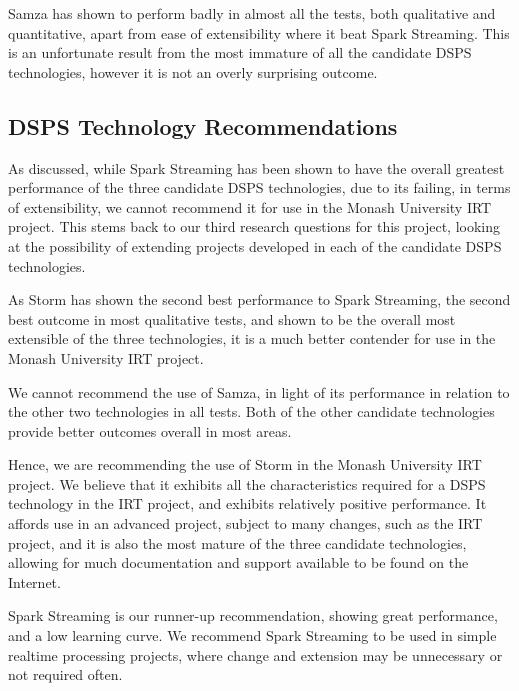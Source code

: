 Samza has shown to perform badly in almost all the tests, both qualitative and quantitative, apart from ease of extensibility where it beat Spark Streaming.
This is an unfortunate result from the most immature of all the candidate DSPS technologies, however it is not an overly
surprising outcome.



\subsection{DSPS Technology Recommendations} %
\label{sub:dsps_technology_recommendations}

As discussed, while Spark Streaming has been shown to have the overall greatest performance of the three candidate DSPS
technologies, due to its failing, in terms of extensibility, we cannot recommend it for use in the Monash University IRT
project. This stems back to our third research questions for this project, looking at the possibility of extending projects
developed in each of the candidate DSPS technologies.

As Storm has shown the second best performance to Spark Streaming, the second best outcome in most qualitative tests,
and shown to be the overall most extensible of the three technologies, it is a much better contender for use in the Monash
University IRT project.

We cannot recommend the use of Samza, in light of its performance in relation to the other two technologies in all tests.
Both of the other candidate technologies provide better outcomes overall in most areas.

Hence, we are recommending the use of Storm in the Monash University IRT project. We believe that it exhibits all the
characteristics required for a DSPS technology in the IRT project, and exhibits relatively positive performance. It affords
use in an advanced project, subject to many changes, such as the IRT project, and it is
also the most mature of the three candidate technologies, allowing for much documentation and support available to be found on the
Internet.

Spark Streaming is our runner-up recommendation, showing great performance, and a low learning curve. We recommend
Spark Streaming to be used in simple realtime processing projects, where change and extension may be unnecessary or not
required often.



